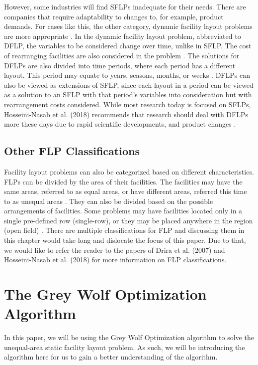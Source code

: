However, some industries will find SFLPs inadequate for their needs. There are companies that require adaptability to changes to, for example, product demands. For cases like this, the other category, dynamic facility layout problems are more appropriate \cite{DerakhshanAsl2017}. In the dynamic facility layout problem, abbreviated to DFLP, the variables to be considered change over time, unlike in SFLP. The cost of rearranging facilities are also considered in the problem \cite{Hosseini2016}. The solutions for DFLPs are also divided into time periods, where each period has a different layout. This period may equate to years, seasons, months, or weeks \cite{DerakhshanAsl2017}. DFLPs can also be viewed as extensions of SFLP, since each layout in a period can be viewed as a solution to an SFLP with that period's variables into consideration but with rearrangement costs considered. While most research today is focused on SFLPs, Hosseini-Nasab et al. (2018) recommends that research should deal with DFLPs more these days due to rapid scientific developments, and product changes \cite{Hosseini-Nasab2018}.

\subsection{Other FLP Classifications}
Facility layout problems can also be categorized based on different characteristics. FLPs can be divided by the area of their facilities. The facilities may have the same areas, referred to as equal areas, or have different areas, referred this time to as unequal areas \cite{DerakhshanAsl2017}. They can also be divided based on the possible arrangements of facilities. Some problems may have facilities located only in a single pre-defined row (single-row), or they may be placed anywhere in the region (open field) \cite{Drira2007}. There are multiple classifications for FLP and discussing them in this chapter would take long and dislocate the focus of this paper. Due to that, we would like to refer the reader to the papers of Drira et al. (2007) \cite{Drira2007} and Hosseini-Nasab et al. (2018) \cite{Hosseini-Nasab2018} for more information on FLP classifications.

\section{The Grey Wolf Optimization Algorithm}
In this paper, we will be using the Grey Wolf Optimization algorithm to solve the unequal-area static facility layout problem. As such, we will be introducing the algorithm here for us to gain a better understanding of the algorithm.

